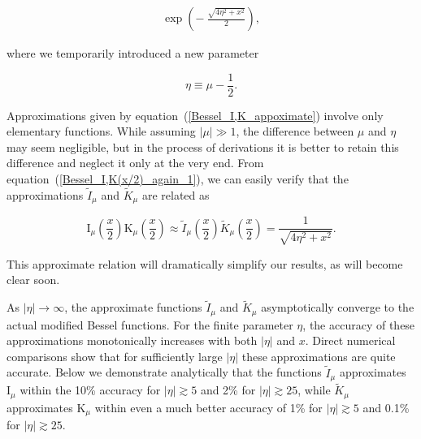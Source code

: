\documentclass[draft]{agujournal2019}
\begin{document}
{\begin{linenomath*}
\begin{subequations}
\begin{align}
{}\exp\left(  -\ \frac{\sqrt{4\eta^{2}+x^{2}}}{2}\right)  ,
\label{Bessel_K_appoximate}
\end{align}
\end{subequations}
\end{linenomath*}
where we temporarily introduced a new parameter
\begin{linenomath*}
\begin{equation}
\eta\equiv\mu-\frac{1}{2}. 
\label{eta_via_mu}
\end{equation}
\end{linenomath*}
Approximations given by equation~(\ref{Bessel_I,K_appoximate}) involve only
elementary functions.  While assuming $|\mu|\gg 1$, the difference between $\mu$ 
and $\eta$ may seem negligible, but in the process of derivations it is better to retain this 
difference and neglect it only at the very end. From equation~(\ref{Bessel_I,K(x/2)_again_1}), we can easily verify
that the approximations $\tilde{I}_{\mu}$ and $\tilde{K}_{\mu}$ are related as
\begin{linenomath*}
\begin{equation}
\mathrm{I}_{\mu}\left(  \frac{x}{2}\right)  \mathrm{K}_{\mu}\left(  \frac
{x}{2}\right)  \approx\tilde{I}_{\mu}\left(  \frac{x}{2}\right)  \tilde
{K}_{\mu}\left(  \frac{x}{2}\right)  =\frac{1}{\sqrt{4\eta^{2}+x^{2}}}.
\label{svoystvo}
\end{equation}
\end{linenomath*}
This approximate relation will dramatically simplify our results, as will
become clear soon.

As $|\eta| \rightarrow\infty$, the approximate functions
$\tilde{I}_{\mu}$ and $\tilde{K}_{\mu}$ asymptotically converge to the actual
modified Bessel functions. For the finite parameter $\eta$, the accuracy of
these approximations monotonically increases with both $|\eta|$ and $x$.
Direct numerical comparisons show that for sufficiently large $|\eta| $ these approximations are quite accurate. Below we
demonstrate analytically that the functions $\tilde{I}_{\mu}$ approximates
$\mathrm{I}_{\mu}$ within the 10\% accuracy for $|\eta|
\gtrsim5$ and 2\% for $|\eta| \gtrsim25$, while $\tilde
{K}_{\mu}$ approximates $\mathrm{K}_{\mu}$ within even a much better accuracy of
1\% for $|\eta| \gtrsim5$ and 0.1\% for $|\eta| \gtrsim25$.

}
\end{document}
